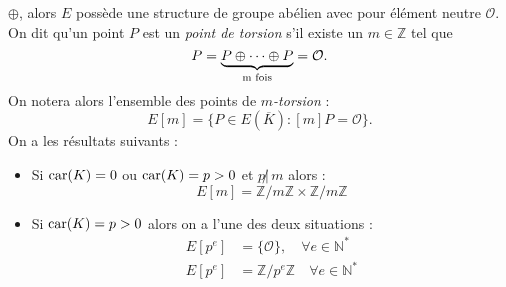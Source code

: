 \documentclass[a4paper]{article} %
\numberwithin{section}{part}
\numberwithin{equation}{section}
\newcommand\zmodn[1]{\mathbb{Z}/#1\mathbb{Z}}
\newcommand\ZZ{\mathbb{Z}}
\newcommand\NN{\mathbb{N}}
\newcommand\EO{\mathcal{O}}
\begin{document}
$\oplus$, alors $E$ possède une structure de groupe abélien avec pour élément 
neutre $\EO$. On dit qu'un point $P$ est un \emph{point de torsion} s'il existe 
un $m\in\ZZ$ tel que 
\begin{equation}
[m]P = \underbrace{P\oplus\dots\oplus P}_{\textup{m fois}} = \EO.
\end{equation}
On notera alors l'ensemble des points de \emph{$m$-torsion} :
\begin{equation}
E[m] = \lbrace{P\in E(\overline{K}) : [m]P = \EO}\rbrace.
\end{equation}
On a les résultats suivants :
\vspace{0.3cm}
\begin{itemize}
\item Si $\textup{car}(K) = 0$ ou $\textup{car}(K) = p > 0$ et $p\not|\,m$ 
alors :
\begin{equation}
E[m] = \zmodn{m}\times\zmodn{m}
\end{equation}
\item Si $\textup{car}(K) = p > 0$ alors on a l'une des deux situations :
    \begin{align} 
    E[p^e] &= \lbrace{\EO}\rbrace, \quad \forall e\in\NN^{*}\\
    E[p^e] &= \zmodn{p^e}\quad \forall e\in\NN^{*}
    \end{align}
\end{itemize}
\vspace{0.3cm}
\end{document}
